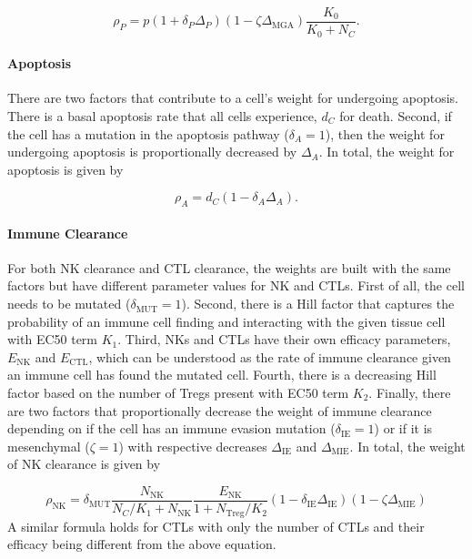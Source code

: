 \documentclass[11pt]{article}
\begin{document}
\begin{equation}\tag{2.1}
\rho_P = p(1+\delta_{P}\Delta_P)(1-\zeta \Delta_{\text{MGA}})\frac{K_0}{K_0+N_C}.
\end{equation}

\paragraph{Apoptosis}
There are two factors that contribute to a cell's weight for undergoing apoptosis.
There is a basal apoptosis rate that all cells experience, $d_C$ for death.
Second, if the cell has a mutation in the apoptosis pathway ($\delta_A=1$), then the weight for undergoing apoptosis is proportionally decreased by $\Delta_A$.
In total, the weight for apoptosis is given by 

\begin{equation}\tag{2.2}
\rho_A = d_C(1-\delta_{A}\Delta_A).
\end{equation}

\paragraph{Immune Clearance}
For both NK clearance and CTL clearance, the weights are built with the same factors but have different parameter values for NK and CTLs.
First of all, the cell needs to be mutated ($\delta_{\text{MUT}}=1$).
Second, there is a Hill factor that captures the probability of an immune cell finding and interacting with the given tissue cell with EC50 term $K_1$.
Third, NKs and CTLs have their own efficacy parameters, $E_{\text{NK}}$ and $E_{\text{CTL}}$, which can be understood as the rate of immune clearance given an immune cell has found the mutated cell.
Fourth, there is a decreasing Hill factor based on the number of Tregs present with EC50 term $K_2$.
Finally, there are two factors that proportionally decrease the weight of immune clearance depending on if the cell has an immune evasion mutation ($\delta_{\text{IE}}=1$) or if it is mesenchymal ($\zeta=1$) with respective decreases $\Delta_{\text{IE}}$ and $\Delta_{\text{MIE}}$.
In total, the weight of NK clearance is given by

\begin{equation}\tag{2.3}
\rho_{\text{NK}} =\delta_{\text{MUT}} \frac{N_{\text{NK}}}{N_C/K_{1}+N_{\text{NK}}}  \frac{E_{\text{NK}}}{1+N_{\text{Treg}}/K_2} (1-\delta_{\text{IE}}\Delta_{\text{IE}})(1-\zeta \Delta_{\text{MIE}})
\end{equation}
A similar formula holds for CTLs with only the number of CTLs and their efficacy being different from the above equation.
\end{document}
